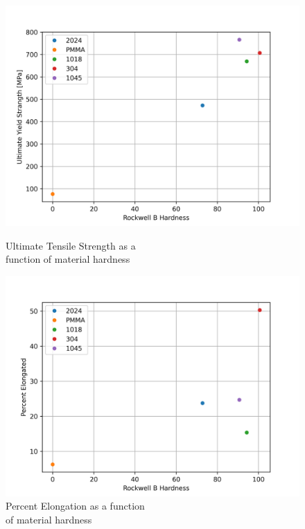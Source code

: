 \documentclass{article}
\begin{document}
\begin{figure}[!h!]
\begin{minipage}[b]{0.5\linewidth}
  \end{minipage} 
  \begin{minipage}[b]{0.5\linewidth}
    \centering
    \includegraphics[width=\linewidth]{plots/q3_uts.png} 
    \caption{Ultimate Tensile Strength as a \\ function of material hardness} 
    \vspace{4ex}
  \end{minipage}
  \begin{minipage}[b]{0.5\linewidth}
    \centering
    \includegraphics[width=\linewidth]{plots/q3_perelong.png} 
    \caption{Percent Elongation as a function \\ of material hardness} 
    \vspace{4ex}

\end{minipage}
\end{figure}
\end{document}
